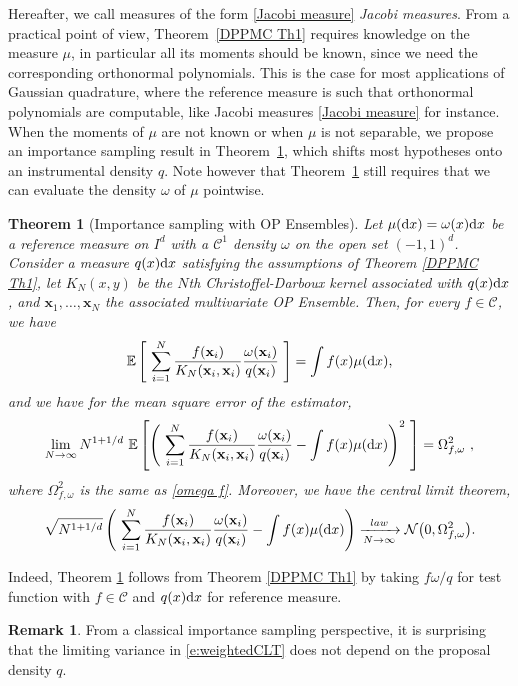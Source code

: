 \documentclass[a4paper,11pt]{article}
\numberwithin{equation}{section}
\newtheorem{theorem}{Theorem}[]
\theoremstyle{definition}
\newtheorem{Remark}[]{Remark}
\newenvironment{remark}{\begin{Remark}\rm}{\end{Remark}}
\newcommand{\rev}[1]{#1}
\newcommand{\eq}{\begin{equation}}
\newcommand{\qe}{\end{equation}}
\newcommand{\E}{\mathbb{E}}
\newcommand{\bv}{\mathbf}
\renewcommand{\d}{ {\rm d}}
\begin{document}
Hereafter, we call measures of the form \eqref{Jacobi measure} \emph{Jacobi
  measures}. From a practical point of view, Theorem~\ref{DPPMC Th1} requires
knowledge on
the measure $\mu$, in particular all its moments should be known, since we need
the corresponding orthonormal polynomials. This is the case for most
applications of Gaussian quadrature, where the reference measure is such that
orthonormal polynomials are computable, like Jacobi measures
\eqref{Jacobi measure} for instance. \rev{When the moments of $\mu$ are not known or when $\mu$ is not separable, we propose an importance sampling result in Theorem~\ref{DPPMC Th2}, which shifts most hypotheses onto an instrumental density $q$. Note however that Theorem~\ref{DPPMC Th2} still requires that we can evaluate the density $\omega$ of $\mu$ pointwise.
}
\begin{theorem}[\rev{Importance sampling with OP Ensembles}]
\label{DPPMC Th2}
Let $\mu(\d x)=\omega(x)\d x$ be a reference measure on $I^d$ with a $\mathscr
C^1$ density $\omega$ on the open set $(-1,1)^d$.  Consider a  measure  $q(x)\d
x$ satisfying the assumptions of Theorem \ref{DPPMC Th1}, let $K_N(x,y)$ be the
$N$th Christoffel-Darboux kernel associated with $q(x)\d x$, and $\bv x_1,\ldots,\bv x_N$ the associated multivariate OP Ensemble. Then, for every $f\in\mathscr C$, we have
\eq
\E \left[\ \sum_{i=1}^N \frac{f(\bv x_i)}{K_N(\bv x_i,\bv x_i)}\frac{\omega(\bv x_i)}{q(\bv x_i)} \ \right]= \int f(x) \mu(\d x) ,
\qe
and we have for the mean square error of the estimator,
\eq
\lim_{N\to\infty}N^{1+1/d}\ \mathbb E\left[\left(\ \sum_{i=1}^N \frac{f(\bv x_i)}{K_N(\bv x_i,\bv x_i)}\frac{\omega(\bv x_i)}{q(\bv x_i)} - \int f(x)\mu(\d x)\right)^2\ \right]=\Omega_{f,\omega}^2\ ,
\qe
where $\Omega_{f,\omega}^2$ is the same as \eqref{omega f}.  Moreover, we have the central limit theorem,
\eq
\sqrt{N^{1+1/d}}\left( \ \sum_{i=1}^N \frac{f(\bv x_i)}{K_N(\bv x_i,\bv
    x_i)}\frac{\omega(\bv x_i)}{q(\bv x_i)} - \int f(x) \mu(\d
  x)\right)\xrightarrow[N\to\infty]{law } \mathcal
N\big(0,\Omega_{f,\omega}^2\big).
\label{e:weightedCLT}
\qe
\end{theorem}

Indeed, Theorem \ref{DPPMC Th2} follows from Theorem \ref{DPPMC Th1} by taking
$f\omega/q$ for test function with $f\in\mathscr C$ and $q(x)\d x$ for reference
measure.

\begin{remark}
From a classical importance sampling perspective, it is surprising that the limiting variance in \eqref{e:weightedCLT} does not depend on the proposal density $q$.
\end{remark}
\end{document}
